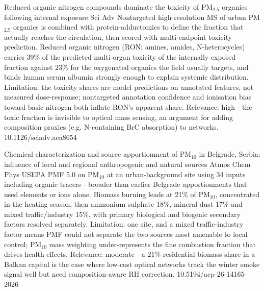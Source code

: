 \documentclass[10pt]{article}
\begin{document}
\par{}\baselineskip{}\baselineskip
{}

{Reduced organic nitrogen compounds dominate the toxicity of PM$_{2.5}$ organics following internal exposure}
{Sci Adv}
{Nontargeted high-resolution MS of urban PM$_{2.5}$ organics is combined with protein-adductomics to define the fraction that actually reaches the circulation, then scored with multi-endpoint toxicity prediction. Reduced organic nitrogen (RON: amines, amides, N-heterocycles) carries 39\% of the predicted multi-organ toxicity of the internally exposed fraction against 23\% for the oxygenated organics the field usually targets, and binds human serum albumin strongly enough to explain systemic distribution. Limitation: the toxicity shares are model predictions on annotated features, not measured dose-response; nontargeted annotation confidence and ionisation bias toward basic nitrogen both inflate RON's apparent share. Relevance: high - the toxic fraction is invisible to optical mass sensing, an argument for adding composition proxies (e.g. N-containing BrC absorption) to networks.}
{10.1126/sciadv.aea8654}

\par{}\baselineskip{}\baselineskip
{}

{Chemical characterization and source apportionment of PM$_{10}$ in Belgrade, Serbia: influence of local and regional anthropogenic and natural sources}
{Atmos Chem Phys}
{USEPA PMF 5.0 on PM$_{10}$ at an urban-background site using 34 inputs including organic tracers - broader than earlier Belgrade apportionments that used elements or ions alone. Biomass burning leads at 21\% of PM$_{10}$, concentrated in the heating season, then ammonium sulphate 18\%, mineral dust 17\% and mixed traffic/industry 15\%, with primary biological and biogenic secondary factors resolved separately. Limitation: one site, and a mixed traffic-industry factor means PMF could not separate the two sources most amenable to local control; PM$_{10}$ mass weighting under-represents the fine combustion fraction that drives health effects. Relevance: moderate - a 21\% residential biomass share in a Balkan capital is the case where low-cost optical networks track the winter smoke signal well but need composition-aware RH correction.}
{10.5194/acp-26-14165-2026}
\end{document}
